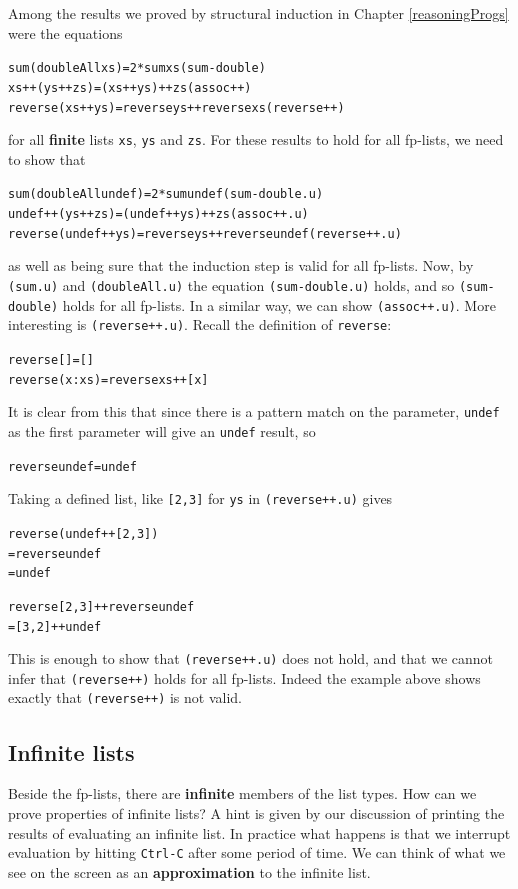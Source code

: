 \medskip
\noindent
Among the results we proved by structural induction in Chapter \ref{reasoningProgs}
were the equations
\begin{alltt}
sum (doubleAll xs) = 2 * sum xs \hfill (sum-double)
xs ++ (ys ++ zs)   = (xs ++ ys) ++ zs\hfill (assoc++)\minx{++}
reverse (xs ++ ys) = reverse ys ++ reverse xs\hfill (reverse++)
\end{alltt}
for all \textbf{finite} lists \texttt{xs}, \texttt{ys} and \texttt{zs}. For these results to
hold for all fp-lists, we need to show that
\begin{alltt}
sum (doubleAll undef) = 2 * sum undef \hfill (sum-double.u)
undef ++ (ys ++ zs)   = (undef ++ ys) ++ zs\hfill (assoc++.u)
reverse (undef ++ ys) = reverse ys ++ reverse undef\hfill (reverse++.u)
\end{alltt}
as well as being sure that the induction step is valid for all fp-lists.
Now, by \texttt{(sum.u)} and \texttt{(doubleAll.u)} the equation \texttt{(sum-double.u)} 
holds, and so \texttt{(sum-double)}
holds for all fp-lists. In a similar way, we can show \texttt{(assoc++.u)}.
More interesting is \texttt{(reverse++.u)}. Recall the definition of \texttt{reverse}:
\begin{alltt}
reverse []    = []
reverse (x:xs) = reverse xs ++ [x] 
\end{alltt}
It is clear from this that since there is a pattern match on the
parameter, \texttt{undef} as the first parameter will give an \texttt{undef}
result, so
\begin{alltt}
reverse undef = undef
\end{alltt}
Taking a defined list, like \texttt{[2,3]} for \texttt{ys} in \texttt{(reverse++.u)}
gives
\begin{alltt}
reverse (undef ++ [2,3])
  = reverse undef
  = undef

reverse [2,3] ++ reverse undef
  = [3,2] ++ undef
\end{alltt}
This is enough to show that \texttt{(reverse++.u)} does not hold, and that we cannot
infer that \texttt{(reverse++)} holds for all fp-lists. Indeed the example above shows
exactly that \texttt{(reverse++)} is not valid.

\subsection*{Infinite lists}

Beside the fp-lists, there are \textbf{infinite} members of the list types.
How can we prove properties of infinite lists? A hint is given by our
discussion of printing the results of evaluating an infinite list. In practice
what happens is that we interrupt evaluation by hitting \texttt{Ctrl-C}
after some period of time. We can think of what we see on the screen as an
\textbf{approximation} to the infinite list. 

